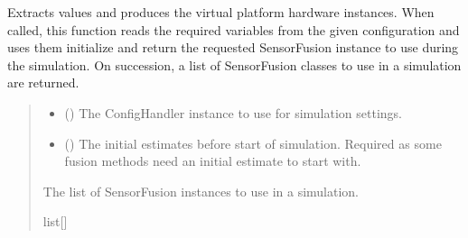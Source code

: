 \documentclass[letterpaper,10pt,english]{sphinxmanual}
\begin{document}

\begin{fulllineitems}
\label{\detokenize{modules/input/config:qnav.input.config.get_platform_hardware}}
\pysigstartsignatures
{}
\pysigstopsignatures
\sphinxAtStartPar
Extracts values and produces the virtual platform hardware instances.
When called, this function reads the required variables from the
given configuration and uses them initialize and return the requested
Sensor\sphinxhyphen{}Fusion instance to use during the simulation. On succession,
a list of SensorFusion classes to use in a simulation are returned.
\begin{quote}\begin{description}
\begin{itemize}
\item {} 
\sphinxAtStartPar
{} ({\hyperref[\detokenize{modules/input/config_handler:qnav.input.config_handler.ConfigHandler}]{}}) \textendash{} The ConfigHandler instance to use for simulation settings.

\item {} 
\sphinxAtStartPar
{} ({\hyperref[\detokenize{modules/estimation/state:qnav.estimation.state.EstimatedState}]{}}) \textendash{} The initial estimates before start of simulation.
Required as some fusion methods need an initial estimate to start with.

\end{itemize}

\sphinxAtStartPar
The list of SensorFusion instances to use in a simulation.

\sphinxAtStartPar
list{[}{\hyperref[\detokenize{modules/measurement/sensor:qnav.measurement.sensor.SensorFusion}]{}}{]}

\end{description}\end{quote}

\end{fulllineitems}
\end{document}
